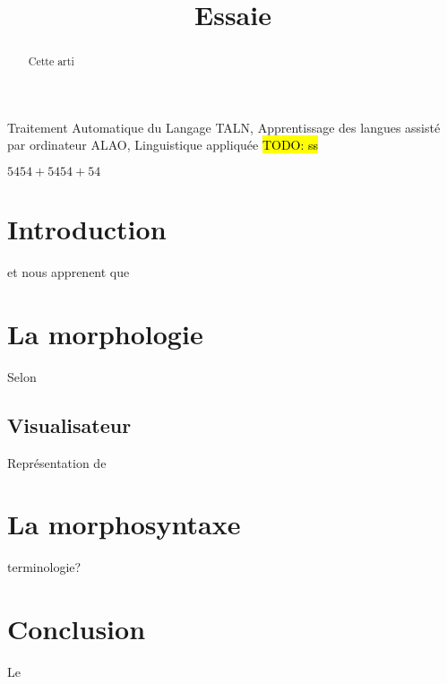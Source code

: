 \documentclass[9pt]{sigplanconf}
\title{Essaie}
\newcommand{\TODO}[1]{\hl{TODO: #1}}
\begin{document}
\maketitle

\begin{abstract}
Cette arti
\end{abstract}

\keywords Traitement Automatique du Langage TALN,
Apprentissage des langues assisté par ordinateur ALAO,
Linguistique appliquée
\TODO{ss}

$5454+5454+54$

\section{Introduction}


\cite{souque:tel-01247368} et \cite{ravestein:hal-01777733} nous apprenent que



\section{La morphologie}

Selon

\subsection{Visualisateur}
Représentation de

\section{La morphosyntaxe}
terminologie?

\section{Conclusion}
Le 



\end{document}
